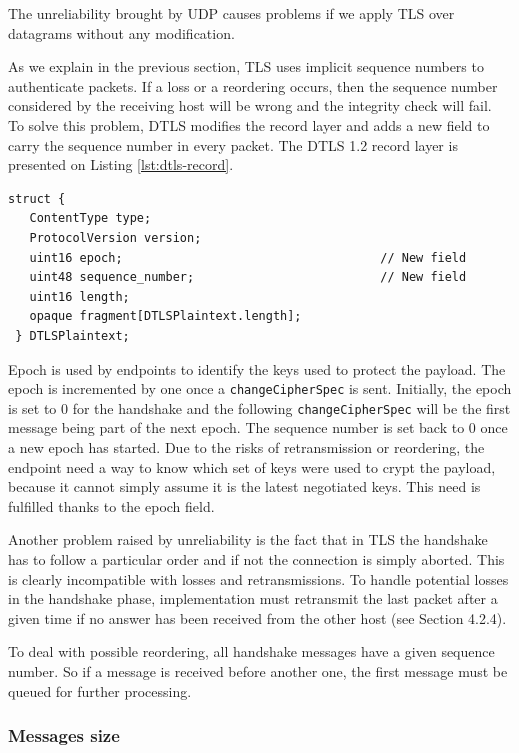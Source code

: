 The unreliability brought by UDP causes problems if we apply TLS over datagrams without any modification.

As we explain in the previous section, TLS uses implicit sequence numbers to authenticate packets. If a loss or a reordering occurs, then the sequence number considered by the receiving host will be wrong and the integrity check will fail. To solve this problem, DTLS modifies the record layer and adds a new field to carry the sequence number in every packet. The DTLS 1.2 record layer is presented on Listing \ref{lst:dtls-record}.

\begin{lstlisting}[caption=DTLS record layer, label=lst:dtls-record]
struct {
   ContentType type;
   ProtocolVersion version;
   uint16 epoch;                                    // New field
   uint48 sequence_number;                          // New field
   uint16 length;
   opaque fragment[DTLSPlaintext.length];
 } DTLSPlaintext;
\end{lstlisting}


Epoch is used by endpoints to identify the keys used to protect the payload. The epoch is incremented by one once a \texttt{changeCipherSpec} is sent. Initially, the epoch is set to 0 for the handshake and the following \texttt{changeCipherSpec} will be the first message being part of the next epoch. The sequence number is set back to 0 once a new epoch has started. Due to the risks of retransmission or reordering, the endpoint need a way to know which set of keys were used to crypt the payload, because it cannot simply assume it is the latest negotiated keys. This need is fulfilled thanks to the epoch field.

Another problem raised by unreliability is the fact that in TLS the handshake has to follow a particular order and if not the connection is simply aborted. This is clearly incompatible with losses and retransmissions. To handle potential losses in the handshake phase, implementation must retransmit the last packet after a given time if no answer has been received from the other host (see \cite{rfc6347} Section 4.2.4).

To deal with possible reordering, all handshake messages have a given sequence number. So if a message is received before another one, the first message must be queued for further processing.

\subsubsection{Messages size}

